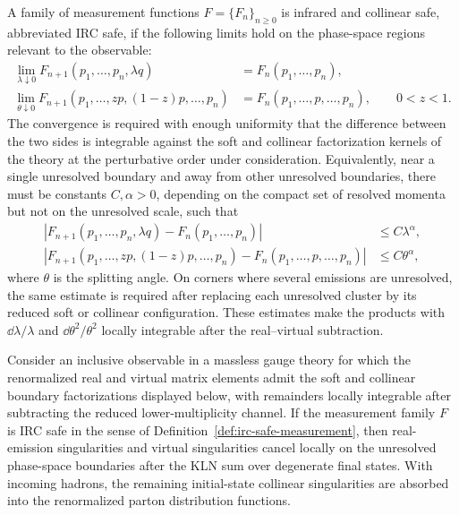 \begin{definition}
\label{def:irc-safe-measurement}
A family of measurement functions \(F=\{F_n\}_{n\geq0}\) is infrared and
collinear safe, abbreviated IRC safe, if the following limits hold on the
phase-space regions relevant to the observable:
\begin{align}
  \lim_{\lambda\downarrow0}
  F_{n+1}(p_1,\ldots,p_n,\lambda q)
  &=
  F_n(p_1,\ldots,p_n),
  \label{eq:irc-soft-safety}\\
  \lim_{\theta\downarrow0}
  F_{n+1}(p_1,\ldots,zp,(1-z)p,\ldots,p_n)
  &=
  F_n(p_1,\ldots,p,\ldots,p_n),
  \qquad 0<z<1.
  \label{eq:irc-collinear-safety}
\end{align}
The convergence is required with enough uniformity that the difference between
the two sides is integrable against the soft and collinear factorization
kernels of the theory at the perturbative order under consideration.
Equivalently, near a single unresolved boundary and away from other unresolved
boundaries, there must be constants \(C,\alpha>0\), depending on the compact
set of resolved momenta but not on the unresolved scale, such that
\begin{align}
  |F_{n+1}(p_1,\ldots,p_n,\lambda q)-F_n(p_1,\ldots,p_n)|
  &\le C\lambda^\alpha,\\
  |F_{n+1}(p_1,\ldots,zp,(1-z)p,\ldots,p_n)
    -F_n(p_1,\ldots,p,\ldots,p_n)|
  &\le C\theta^\alpha ,
\end{align}
where \(\theta\) is the splitting angle.  On corners where several emissions
are unresolved, the same estimate is required after replacing each unresolved
cluster by its reduced soft or collinear configuration.  These estimates make
the products with \(\dd\lambda/\lambda\) and
\(\dd\theta^2/\theta^2\) locally integrable after the real--virtual
subtraction.
\end{definition}

\begin{controlledapproximation}
\label{capprox:irc-safety-fixed-order-finiteness}
Consider an inclusive observable in a massless gauge theory for which the
renormalized real and virtual matrix elements admit the soft and collinear
boundary factorizations displayed below, with remainders locally integrable
after subtracting the reduced lower-multiplicity channel.  If the measurement
family \(F\) is IRC safe in the sense of
Definition~\ref{def:irc-safe-measurement}, then real-emission singularities
and virtual singularities cancel locally on the unresolved phase-space
boundaries after the KLN sum over degenerate final states.  With incoming
hadrons, the remaining initial-state collinear singularities are absorbed into
the renormalized parton distribution functions.
\end{controlledapproximation}

